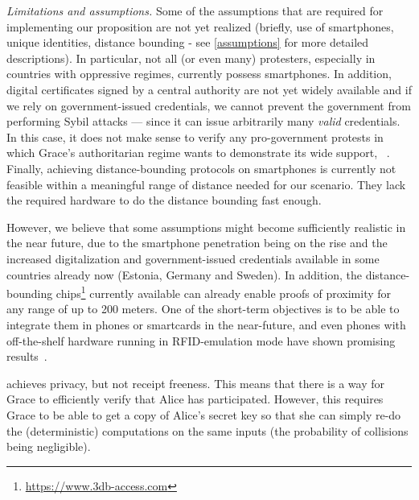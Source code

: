 \emph{Limitations and assumptions.} Some of the assumptions that are required 
for implementing our proposition are not yet realized (briefly, use of smartphones, unique identities, distance bounding - see \cref{assumptions} 
for more detailed descriptions). In particular, not all (or even many) 
protesters, especially in countries with oppressive regimes, currently possess 
smartphones.
In addition, digital certificates signed by a central authority are not yet widely available and if we rely on government-issued credentials, we cannot prevent the government from performing Sybil attacks --- since it can issue arbitrarily many \emph{valid} credentials. 
In this case, it does not make sense to verify any pro-government protests in 
which Grace's authoritarian regime wants to demonstrate its wide support, 
\eg~\cite{AlJazeeraOnVenezuela2017,VenezuelanStateWorkersCalledToParticipate}.
Finally, achieving distance-bounding protocols on smartphones is currently not 
feasible within a meaningful range of distance needed for our scenario.
They lack the required hardware to do the distance bounding fast enough.

However, we believe that some assumptions might become sufficiently realistic in 
the near future, due to the smartphone penetration being on the rise and the 
increased digitalization and government-issued credentials available in some 
countries already now (\eg Estonia, Germany and Sweden).
In addition, the distance-bounding 
chips\footnote{\url{https://www.3db-access.com}} currently available can already 
enable proofs of proximity for any range of up to 200 meters.
One of the short-term objectives is to be able to integrate them in phones or smartcards in the near-future, and even phones with off-the-shelf hardware running in RFID-emulation mode have shown promising results~\cite{DBonSmartphones}.

\PRIVO achieves privacy, but not receipt freeness.
This means that there is a way for Grace to efficiently verify that Alice has 
participated.
However, this requires Grace to be able to get a copy of Alice's secret key so that she can simply re-do the (deterministic) computations on the same inputs (the probability of collisions being negligible).

